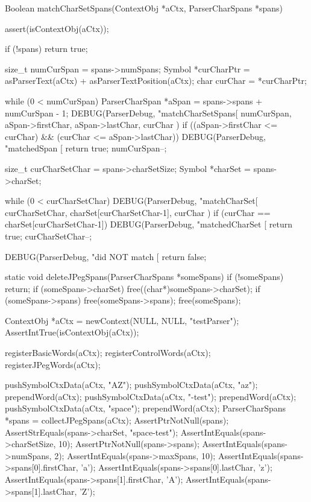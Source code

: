 \startCCode
Boolean matchCharSetSpans(ContextObj *aCtx, ParserCharSpans *spans) {
  assert(isContextObj(aCtx));
  
  if (!spans) return true;
  
  size_t numCurSpan  = spans->numSpans;
  Symbol *curCharPtr = asParserText(aCtx) + asParserTextPosition(aCtx);
  char curChar       = *curCharPtr;
  
  while (0 < numCurSpan) {
    ParserCharSpan *aSpan = spans->spans + numCurSpan - 1;
    DEBUG(ParserDebug, "matchCharSetSpans[%
      numCurSpan, aSpan->firstChar, aSpan->lastChar, curChar
    )
    if ((aSpan->firstChar <= curChar) && (curChar <= aSpan->lastChar)) {
      DEBUG(ParserDebug, "matchedSpan [%
      return true;
    } 
    numCurSpan--;
  }
  
  size_t curCharSetChar = spans->charSetSize;
  Symbol *charSet       = spans->charSet;
  
  while (0 < curCharSetChar) {
    DEBUG(ParserDebug, "matchCharSet[%
      curCharSetChar, charSet[curCharSetChar-1], curChar
    )
    if (curChar == charSet[curCharSetChar-1]) {
      DEBUG(ParserDebug, "matchedCharSet [%
      return true;
    }
    curCharSetChar--;
  }
  
  DEBUG(ParserDebug, "did NOT match [%
  return false;
}
\stopCCode

\startCCode
static void deleteJPegSpans(ParserCharSpans *someSpans) {
  if (!someSpans) return;
  if (someSpans->charSet) free((char*)someSpans->charSet);
  if (someSpans->spans)   free(someSpans->spans);
  free(someSpans);
}
\stopCCode


\startCTest
  ContextObj *aCtx = newContext(NULL, NULL, "testParser");
  AssertIntTrue(isContextObj(aCtx));
  
  registerBasicWords(aCtx);
  registerControlWords(aCtx);
  registerJPegWords(aCtx);
  
  pushSymbolCtxData(aCtx, "AZ");
  pushSymbolCtxData(aCtx, "az");
  prependWord(aCtx);
  pushSymbolCtxData(aCtx, "-test");
  prependWord(aCtx);
  pushSymbolCtxData(aCtx, "space");
  prependWord(aCtx);
  ParserCharSpans *spans = collectJPegSpans(aCtx);
  AssertPtrNotNull(spans);
  AssertStrEquals(spans->charSet, "space-test");
  AssertIntEquals(spans->charSetSize, 10);
  AssertPtrNotNull(spans->spans);
  AssertIntEquals(spans->numSpans, 2);
  AssertIntEquals(spans->maxSpans, 10);
  AssertIntEquals(spans->spans[0].firstChar, 'a');
  AssertIntEquals(spans->spans[0].lastChar,  'z');
  AssertIntEquals(spans->spans[1].firstChar, 'A');
  AssertIntEquals(spans->spans[1].lastChar,  'Z');
  
